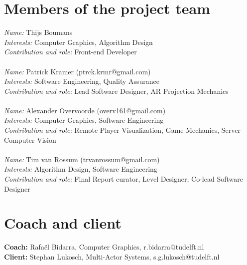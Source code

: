 \documentclass[]{article}
\begin{document}
\section*{Members of the project team}
\textit{Name:} Thijs Boumans\\
\textit{Interests:} Computer Graphics, Algorithm Design \\
\textit{Contribution and role:} Front-end Developer \\
\\
\textit{Name:} Patrick Kramer (ptrck.krmr@gmail.com) \\
\textit{Interests:} Software Engineering, Quality Assurance \\
\textit{Contribution and role:} Lead Software Designer, AR Projection Mechanics \\
\\
\textit{Name:} Alexander Overvoorde (overv161@gmail.com)\\
\textit{Interests:} Computer Graphics, Software Engineering\\
\textit{Contribution and role:} Remote Player Visualization, Game Mechanics, Server Computer Vision\\
\\
\textit{Name:} Tim van Rossum (trvanrossum@gmail.com)\\
\textit{Interests:} Algorithm Design, Software Engineering \\
\textit{Contribution and role:} Final Report curator, Level Designer, Co-lead Software Designer \\

\section*{Coach and client}
\textbf{Coach:} Rafa\"el Bidarra, Computer Graphics, r.bidarra@tudelft.nl\\
\textbf{Client:} Stephan Lukosch, Multi-Actor Systems, s.g.lukosch@tudelft.nl
\end{document}
